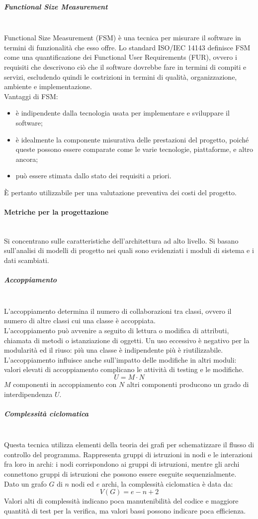 \subparagraph{Functional Size Measurement}\mbox{}\\
Functional Size Measurement (FSM) è una tecnica per misurare il software in termini di funzionalità che esso offre. Lo standard ISO/IEC 14143 definisce FSM come una quantificazione dei Functional User Requirements (FUR), ovvero i requisiti che descrivono ciò che il software dovrebbe fare in termini di compiti e servizi, escludendo quindi le costrizioni in termini di qualità, organizzazione, ambiente e implementazione.\\
Vantaggi di FSM:
\begin{itemize}
	\item è indipendente dalla tecnologia usata per implementare e sviluppare il software;
	\item è idealmente la componente misurativa delle prestazioni del progetto, poiché queste possono essere comparate come le varie tecnologie, piattaforme, e altro ancora;
	\item può essere stimata dallo stato dei requisiti a priori.
\end{itemize}
\`{E} pertanto utilizzabile per una valutazione preventiva dei costi del progetto.

\paragraph{Metriche per la progettazione}\mbox{}\\
Si concentrano sulle caratteristiche dell'architettura ad alto livello. Si basano sull'analisi di modelli di progetto nei quali sono evidenziati i moduli di sistema e i dati scambiati.

\subparagraph{Accoppiamento}\mbox{}\\
L'accoppiamento determina il numero di collaborazioni tra classi, ovvero il numero di altre classi cui una classe è accoppiata.\\
L'accoppiamento può avvenire a seguito di lettura o modifica di attributi, chiamata di metodi o istanziazione di oggetti. Un uso eccessivo è negativo per la modularità ed il riuso: più una classe è indipendente più è riutilizzabile. L'accoppiamento influisce anche sull'impatto delle modifiche in altri moduli: valori elevati di accoppiamento complicano le attività di testing e le modifiche.
\[ U = M \cdot N \]
$M$ componenti in accoppiamento con $N$ altri componenti producono un grado di interdipendenza $U$.

\subparagraph{Complessità ciclomatica}\mbox{}\\
Questa tecnica utilizza elementi della teoria dei grafi per schematizzare il flusso di controllo del programma. Rappresenta gruppi di istruzioni in nodi e le interazioni fra loro in archi: i nodi corrispondono ai gruppi di istruzioni, mentre gli archi connettono gruppi di istruzioni che possono essere eseguite sequenzialmente.\\
Dato un grafo $G$ di $n$ nodi ed $e$ archi, la complessità ciclomatica è data da:
\[ V\left(G\right) = e - n + 2 \]
Valori alti di complessità indicano poca manutenibilità del codice e maggiore quantità di test per la verifica, ma valori bassi possono indicare poca efficienza.


